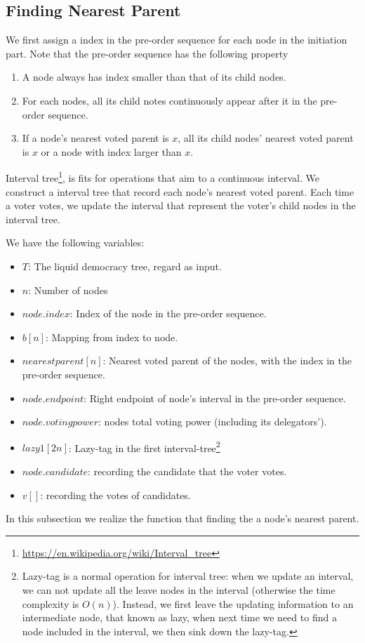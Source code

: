 \subsection{Finding Nearest Parent}
We first assign a index in the pre-order sequence for each node in the initiation part. Note that the pre-order sequence has the following property
\begin{enumerate}
	\item A node always has index smaller than that of its child nodes.
    \item For each nodes, all its child notes continuously appear after it in the pre-order sequence.
	\item If a node's nearest voted parent is $x$, all its child nodes' nearest voted parent is $x$ or a node with index larger than $x$.
\end{enumerate}
Interval tree\footnote{\url{https://en.wikipedia.org/wiki/Interval_tree}}, is fits for operations that aim to a continuous interval. We construct a interval tree that record each node's nearest voted parent. Each time a voter votes, we update the interval that represent the voter's child nodes in the interval tree.

We have the following variables:
\begin{itemize}
	\item $T$: The liquid democracy tree, regard as input.
	\item $n$: Number of nodes
	\item $node.index$: Index of the node in the pre-order sequence.
	\item $b[n]$: Mapping from index to node.
	\item $nearestparent[n]$: Nearest voted parent of the nodes, with the index in the pre-order sequence.
	\item $node.endpoint$: Right endpoint of node's interval in the pre-order sequence.
	\item $node.votingpower$: nodes total voting power (including its delegators').
	\item $lazy1[2n]$: Lazy-tag in the first interval-tree\footnote{Lazy-tag is a normal operation for interval tree: when we update an interval, we can not update all the leave nodes in the interval (otherwise the time complexity is $O(n)$). Instead, we first leave the updating information to an intermediate node, that known as lazy, when next time we need to find a node included in the interval, we then sink down the lazy-tag. }
	\item $node.candidate$: recording the candidate that the voter votes.
	\item $v[]$: recording the votes of candidates.
\end{itemize}
In this subsection we realize the function that finding the a node's nearest parent.

